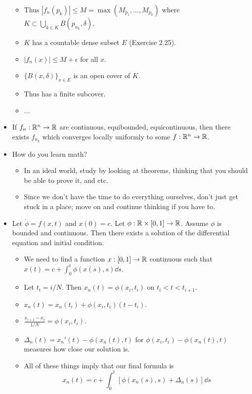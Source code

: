 \documentclass[../../notes.tex]{subfiles}
\begin{document}
\begin{itemize}
\begin{itemize}
        \item Thus $|f_n(p_k)|\leq M=\max(M_{p_1},\dots,M_{p_k})$ where $K\subset\bigcup_{k\in K}B(p_{n_k},\delta)$.
        \item $K$ has a countable dense subset $E$ (Exercise 2.25).
        \item $|f_n(x)|\leq M+\epsilon$ for all $x$.
        \item $\{B(x,\delta)\}_{x\in E}$ is an open cover of $K$.
        \item Thus has a finite subcover.
        \item ...
    \end{itemize}
    \item If $f_n:\mathbb{R}^n\to\mathbb{R}$ are continuous, equibounded, equicontinuous, then there exists $f_{n_k}$ which converges locally uniformly to some $f:\mathbb{R}^n\to\mathbb{R}$.
    \item How do you learn math?
    \begin{itemize}
        \item In an ideal world, study by looking at theorems, thinking that you should be able to prove it, and etc.
        \item Since we don't have the time to do everything ourselves, don't just get stuck in a place; move on and continue thinking if you have to.
    \end{itemize}
    \item Let $\dot{\phi}=f(x,t)$ and $x(0)=c$. Let $\phi:\mathbb{R}\times[0,1]\to\mathbb{R}$. Assume $\phi$ is bounded and continuous. Then there exists a solution of the differential equation and initial condition.
    \begin{itemize}
        \item We need to find a function $x:[0,1]\to\mathbb{R}$ continuous such that $x(t)=c+\int_0^t\phi(x(s),s)\dd{s}$.
        \item Let $t_i=i/N$. Then $x_n(t)=\phi(x_i,t_i)$ on $t_i<t<t_{i+1}$.
        \item $x_n(t)=x_n(t_i)+\phi(x_i,t_i)(t-t_i)$.
        \item $\frac{x_{i+1}-x_i}{1/N}=\phi(x_i,t_i)$.
        \item $\Delta_n(t)=x_n'(t)-\phi(x_n(t),t)$ for $\phi(x_i,t_i)-\phi(x_n(t),t)$ measures how close our solution is.
        \item All of these things imply that our final formula is
        \begin{equation*}
            x_n(t) = c+\int_0^t[\phi(x_n(s),s)+\Delta_n(s)]\dd{s}
        \end{equation*}

\end{itemize}
\end{itemize}
\end{document}
